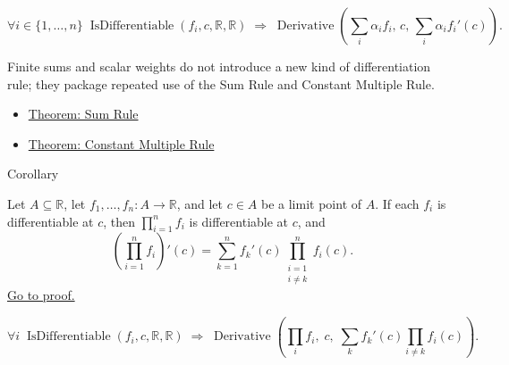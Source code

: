 \begin{remark*}
\[
\forall i \in \{1,\dots,n\}\;\operatorname{IsDifferentiable}(f_i,c,\mathbb{R},\mathbb{R})
\;\Rightarrow\;
\operatorname{Derivative}\!\left(\textstyle\sum_i \alpha_i f_i,\,c,\,\textstyle\sum_i \alpha_i f_i'(c)\right).
\]
\end{remark*}

\begin{remark*}[Interpretation]
Finite sums and scalar weights do not introduce a new kind of differentiation rule; they package repeated use of the Sum Rule and Constant Multiple Rule.
\end{remark*}

\begin{dependencies}
\begin{itemize}
  \item \hyperref[thm:sum-rule]{Theorem: Sum Rule}
  \item \hyperref[thm:constant-multiple-rule]{Theorem: Constant Multiple Rule}
\end{itemize}
\end{dependencies}


\begin{corollarybox}{Corollary}
\begin{corollary}
\label{cor:extended-product-rule}
Let $A \subseteq \mathbb{R}$, let $f_1, \dots, f_n : A \to \mathbb{R}$, and let $c \in A$ be a limit point of $A$. If each $f_i$ is differentiable at $c$, then $\prod_{i=1}^{n} f_i$ is differentiable at $c$, and
\[
\left(\prod_{i=1}^{n} f_i\right)'(c)
=
\sum_{k=1}^{n}
f_k'(c) \prod_{\substack{i=1\\i\neq k}}^{n} f_i(c).
\]
\hyperref[prf:extended-product-rule]{Go to proof.}
\end{corollary}
\end{corollarybox}

\begin{remark*}
\[
\forall i\;\operatorname{IsDifferentiable}(f_i,c,\mathbb{R},\mathbb{R})
\;\Rightarrow\;
\operatorname{Derivative}\!\left(\textstyle\prod_i f_i,\;c,\;\textstyle\sum_k f_k'(c)\prod_{i\neq k} f_i(c)\right).
\]
\end{remark*}

